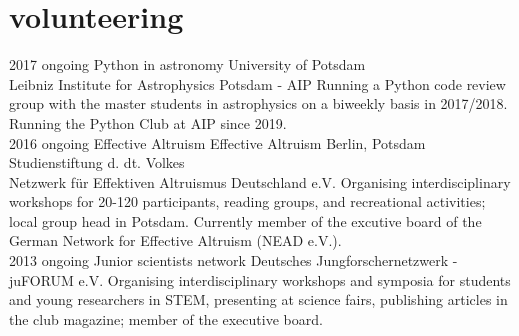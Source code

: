 \documentclass[]{k-cv} %
\begin{document}

\section{volunteering}
\begin{entrylist}
\entry
{2017 \to ongoing}
{Python in astronomy}
{University of Potsdam\vspace{-.1cm}\\\null\hfill Leibniz Institute for Astrophysics Potsdam - AIP}
{Running a Python code review group with the master students in astrophysics on a biweekly basis in 2017/2018. Running the Python Club at AIP since 2019.\\}
\entry
{2016 \to ongoing}
{Effective Altruism}
{Effective Altruism Berlin, Potsdam\vspace{-.1cm}
\\\null\hfill Studienstiftung d. dt. Volkes
\vspace{-.1cm}\\\null\hfill Netzwerk f\"ur Effektiven Altruismus Deutschland e.V.}
{Organising interdisciplinary workshops for 20-120 participants, reading groups, and recreational activities; local group head in Potsdam. Currently member of the excutive board of the German Network for Effective Altruism (NEAD e.V.).\\}
\entry
{2013 \to ongoing}
{Junior scientists network}
{Deutsches Jungforschernetzwerk - juFORUM e.V.}
{Organising interdisciplinary workshops and symposia for students and young researchers in STEM, presenting at science fairs, publishing articles in the club magazine; member of the executive board.}
\end{entrylist}
\end{document}
